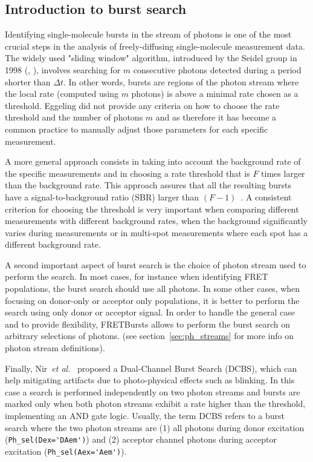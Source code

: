 \subsection{Introduction to burst search}
\label{sec:burstsearch_intro}

Identifying single-molecule bursts in the stream of photons is
one of the most crucial steps in the analysis of freely-diffusing single-molecule measurement data.
The widely used "sliding window" algorithm, introduced by the Seidel group in 1998
(\cite{Eggeling_1998}, \cite{Fries_1998}), involves searching for
$m$ consecutive photons detected during a period shorter than
$\Delta t$. In other words, bursts are regions of the photon stream where the
local rate (computed using $m$ photons) is above a minimal rate chosen as a
threshold. Eggeling did not provide any criteria on how to choose the rate
threshold and the number of photons $m$ and as therefore it has become a common
practice to manually adjust those parameters for each specific measurement.

A more general approach consists in taking into account the background rate of
the specific measurements and in choosing a rate threshold that is $F$ times
larger than the background rate. This approach assures that all the resulting bursts
have a signal-to-background ratio (SBR) larger than
$(F-1)$~\cite{Michalet_2012}. A consistent criterion for choosing the threshold is
very important when comparing different measurements with different background
rates, when the background significantly varies during measurements or in
multi-spot measurements where each spot has a different background rate.

A second important aspect of burst search is the choice of photon stream used
to perform the search.
In most cases, for instance when identifying FRET populations,
the burst search should use all photons. In some other cases, when focusing on
donor-only or acceptor only populations, it is better to perform the search using
only donor or acceptor signal.
In order to handle the general case and to provide flexibility,
FRETBursts allows to perform the burst search on arbitrary selections of photons.
(see section~\ref{sec:ph_streams} for more info on photon stream definitions).

Finally, Nir~\textit{et al.}~\cite{Nir_2006} proposed a Dual-Channel Burst
Search (DCBS), which can help mitigating artifacts due to
photo-physical effects such as blinking. In this case a search is performed
independently on two photon streams and bursts are marked only when both photon
streams exhibit a rate higher than the threshold,
implementing an AND gate logic.
Usually, the term DCBS refers to a burst search where the two photon streams
are (1) all photons
during donor excitation (\verb|Ph_sel(Dex='DAem')|) and (2) acceptor channel photons
during acceptor
excitation (\verb|Ph_sel(Aex='Aem')|).

